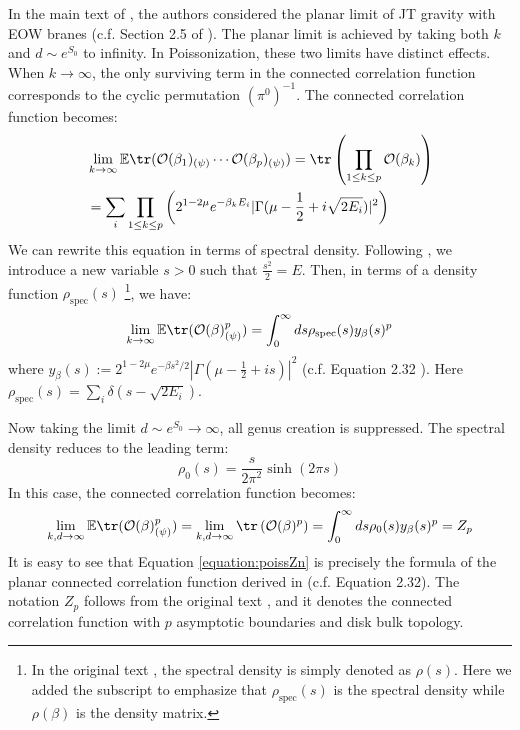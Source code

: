 \documentclass[a4paper,11pt]{article}
\theoremstyle{definition}
\numberwithin{equation}{section}
\newcommand{\lb}{\left(}
\newcommand{\rb}{\right)}
\newcommand{\nn}{\nonumber}
\begin{document}
In the main text of \cite{Penington:2019kki}, the authors considered the planar limit of JT gravity with EOW branes (c.f. Section 2.5 of \cite{Penington:2019kki}). The planar limit is achieved by taking both $k$ and $d\sim e^{S_0}$ to infinity. In Poissonization, these two limits have distinct effects. When $k\rightarrow \infty$, the only surviving term in the connected correlation function corresponds to the cyclic permutation $(\pi^0)^{-1}$. The connected correlation function becomes:
\begin{align}
    &\lim_{k\rightarrow\infty}\mathbb{E}\tr(\mathcal{O}(\beta_1)_{(\psi)}\cdots\mathcal{O}(\beta_p)_{(\psi)}) = \tr\lb\prod_{1\leq k\leq p}\mathcal{O}(\beta_k)\rb \nn\\
    &= \sum_i \prod_{1\leq k\leq p}\lb 2^{1-2\mu}e^{-\beta_k E_i}|\Gamma(\mu - \frac{1}{2} + i\sqrt{2E_i})|^2\rb
\end{align}
We can rewrite this equation in terms of spectral density. Following \cite{Penington:2019kki},   we introduce a new variable $s > 0$ such that $\frac{s^2}{2} = E$. Then, in terms of a density function $\rho_\text{spec}(s)$ \footnote{In the original text \cite{Penington:2019kki}, the spectral density is simply denoted as $\rho(s)$. Here we added the subscript to emphasize that $\rho_\text{spec}(s)$ is the spectral density while $\rho(\beta)$ is the density matrix.}, we have:
\begin{equation}\label{equation:poissZn1}
    \lim_{k\rightarrow\infty}\mathbb{E}\tr(\mathcal{O}(\beta)_{(\psi)}^p) = \int_0^\infty ds\rho_\text{spec}(s)y_\beta(s)^p
\end{equation}
where $y_\beta(s) := 2^{1-2\mu}e^{-\beta s^2 /2}|\Gamma(\mu - \frac{1}{2} + is)|^2$ (c.f. Equation 2.32 \cite{Penington:2019kki}). Here $\rho_\text{spec}(s) = \sum_i\delta(s - \sqrt{2E_i})$.

Now taking the limit $d\sim e^{S_0}\rightarrow\infty$, all genus creation is suppressed. The spectral density reduces to the leading term:
\begin{equation}
    \rho_0(s) = \frac{s}{2\pi^2}\sinh(2\pi s)
\end{equation}
In this case, the connected correlation function becomes:
\begin{equation}\label{equation:poissZn}
    \lim_{k, d\rightarrow\infty}\mathbb{E}\tr(\mathcal{O}(\beta)_{(\psi)}^p) = \lim_{k,d\rightarrow\infty}\tr\lb\mathcal{O}(\beta)^p\rb = \int_0^\infty ds\rho_0(s)y_\beta(s)^p = Z_p
\end{equation}
It is easy to see that Equation \ref{equation:poissZn} is precisely the formula of the planar connected correlation function derived in \cite{Penington:2019kki} (c.f. Equation 2.32). The notation $Z_p$ follows from the original text \cite{Penington:2019kki}, and it denotes the connected correlation function with $p$ asymptotic boundaries and disk bulk topology.
\end{document}
